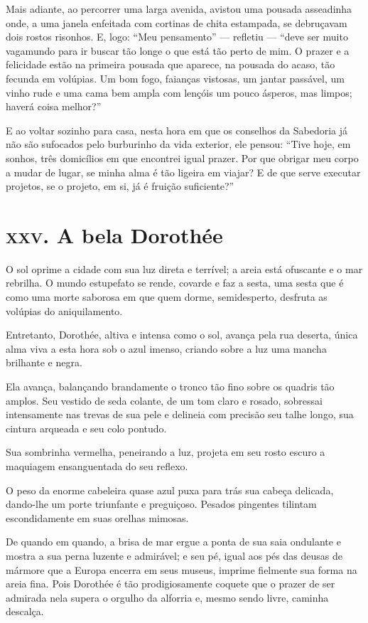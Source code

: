 Mais adiante, ao percorrer uma larga avenida, avistou uma pousada
asseadinha onde, a uma janela enfeitada com cortinas de chita
estampada, se debruçavam dois rostos risonhos. E, logo:
``Meu pensamento'' --- refletiu --- ``deve ser muito vagamundo
para ir buscar tão longe o que está tão perto de mim. O prazer e a
felicidade estão na primeira pousada que aparece, na pousada do
acaso, tão fecunda em volúpias. Um bom fogo, faianças vistosas, um
jantar passável, um vinho rude e uma cama bem ampla com lençóis um
pouco ásperos, mas limpos; haverá coisa melhor?''

E ao voltar sozinho para casa, nesta hora em que os conselhos da
Sabedoria já não são sufocados pelo burburinho da vida exterior,
ele pensou: ``Tive hoje, em sonhos, três domicílios em que
encontrei igual prazer. Por que obrigar meu corpo a mudar de lugar, se minha alma é tão ligeira em viajar? E de que serve executar projetos,
se o projeto, em si, já é fruição suficiente?''

\chapter{\textsc{xxv.} A bela Dorothée}

O sol oprime a cidade com sua luz direta e terrível; a areia está
ofuscante e o mar rebrilha. O mundo estupefato se rende, covarde e faz
a sesta, uma sesta que é como uma morte saborosa em que quem
dorme, semidesperto, desfruta as volúpias do aniquilamento.

Entretanto, Dorothée, altiva e intensa como o sol, avança pela rua
deserta, única alma viva a esta hora sob o azul imenso, criando sobre a
luz uma mancha brilhante e negra.

Ela avança, balançando brandamente o tronco tão fino sobre os
quadris tão amplos. Seu vestido de seda colante, de um tom claro e
rosado, sobressai intensamente nas trevas de sua pele e delineia com
precisão seu talhe longo, sua cintura arqueada e seu colo pontudo.

Sua sombrinha vermelha, peneirando a luz, projeta em seu rosto escuro a
maquiagem ensanguentada do seu reflexo.

O peso da enorme cabeleira quase azul puxa para trás sua cabeça
delicada, dando-lhe um porte triunfante e preguiçoso. Pesados pingentes
tilintam escondidamente em suas orelhas mimosas.

De quando em quando, a brisa de mar ergue a ponta de sua saia ondulante e
mostra a sua perna luzente e admirável; e seu pé, igual aos pés das deusas
de mármore que a Europa encerra em seus museus, imprime fielmente sua
forma na areia fina. Pois Dorothée é tão prodigiosamente coquete que o
prazer de ser admirada nela supera o orgulho da alforria e, mesmo sendo
livre, caminha descalça.

